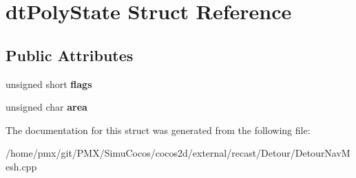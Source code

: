 \hypertarget{structdtPolyState}{}\section{dt\+Poly\+State Struct Reference}
\label{structdtPolyState}
\subsection*{Public Attributes}
\begin{DoxyCompactItemize}
\item 
\mbox{\label{structdtPolyState_a8e3a8a1c15338bbe761ef4d9ca2b4949}} 
unsigned short {\bfseries flags}
\item 
\mbox{\label{structdtPolyState_afd684e7c95d1048ace6dc198457b7c69}} 
unsigned char {\bfseries area}
\end{DoxyCompactItemize}


The documentation for this struct was generated from the following file\+:\begin{DoxyCompactItemize}
\item 
/home/pmx/git/\+P\+M\+X/\+Simu\+Cocos/cocos2d/external/recast/\+Detour/Detour\+Nav\+Mesh.\+cpp\end{DoxyCompactItemize}
